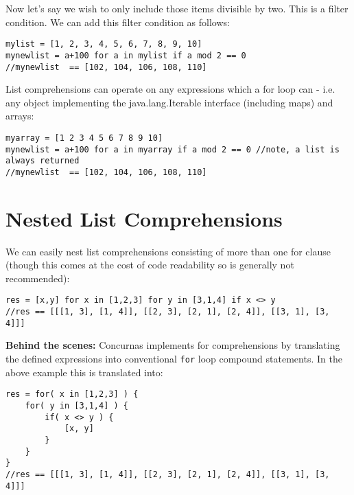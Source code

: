 \documentclass[conc-doc]{subfiles}
\begin{document}
Now let's say we wish to only include those items divisible by two. This is a filter condition. We can add this filter condition as follows:
\begin{lstlisting}
mylist = [1, 2, 3, 4, 5, 6, 7, 8, 9, 10]
mynewlist = a+100 for a in mylist if a mod 2 == 0
//mynewlist  == [102, 104, 106, 108, 110]
\end{lstlisting}

List comprehensions can operate on any expressions which a for loop can - i.e. any object implementing the java.lang.Iterable interface (including maps) and arrays:
\begin{lstlisting}
myarray = [1 2 3 4 5 6 7 8 9 10]
mynewlist = a+100 for a in myarray if a mod 2 == 0 //note, a list is always returned
//mynewlist  == [102, 104, 106, 108, 110]
\end{lstlisting}

\section{Nested List Comprehensions}
We can easily nest list comprehensions consisting of more than one for clause (though this comes at the cost of code readability so is generally not recommended):
\begin{lstlisting}
res = [x,y] for x in [1,2,3] for y in [3,1,4] if x <> y
//res == [[[1, 3], [1, 4]], [[2, 3], [2, 1], [2, 4]], [[3, 1], [3, 4]]]
\end{lstlisting}

\textbf{Behind the scenes:} Concurnas implements for comprehensions by translating the defined expressions into  conventional \lstinline{for} loop compound statements. In the above example this is translated into:
\begin{lstlisting}
res = for( x in [1,2,3] ) {
	for( y in [3,1,4] ) {
		if( x <> y ) {	
			[x, y]
		}
	}
}
//res == [[[1, 3], [1, 4]], [[2, 3], [2, 1], [2, 4]], [[3, 1], [3, 4]]]
\end{lstlisting}
\end{document}

